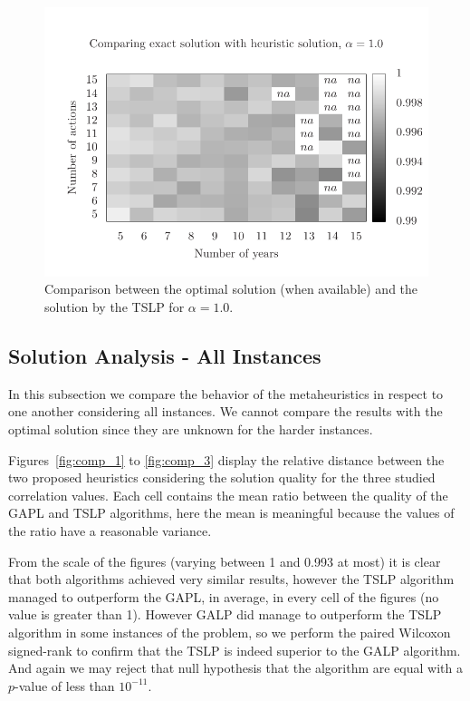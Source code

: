 \begin{figure}
\centering
\includegraphics[scale=0.5, trim=0.75cm 0cm 0 2cm, clip=true]{imgs/comp_easy_ts.pdf}
\caption{Comparison between the optimal solution (when available) 
and the solution by the TSLP for $\alpha=1.0$.}
\label{fig:mh2_3}
\end{figure}


\subsection{Solution Analysis - All Instances}

In this subsection we compare the behavior of the metaheuristics in respect to one another
considering all instances. We cannot compare the results with the optimal solution since they are unknown for the harder instances.

Figures~\ref{fig:comp_1} to \ref{fig:comp_3} display the relative distance between the two proposed 
heuristics considering the solution quality for the three studied correlation values.
Each cell contains the mean ratio between the quality of the GAPL and TSLP algorithms,
here the mean is meaningful because the values of the ratio have a reasonable variance.

From the scale of the figures (varying between 1 and 0.993 at most) it is clear
that both algorithms achieved very similar results, however the TSLP algorithm
managed to outperform the GAPL, in average, in every cell of the figures (no value is greater than 1).
However GALP did manage to outperform the TSLP algorithm in some instances of the problem,
so we perform the paired Wilcoxon signed-rank to confirm that the TSLP is indeed superior
to the GALP algorithm. And again we may reject that null hypothesis that the algorithm
are equal with a $p$-value of less than $10^{-11}$.

